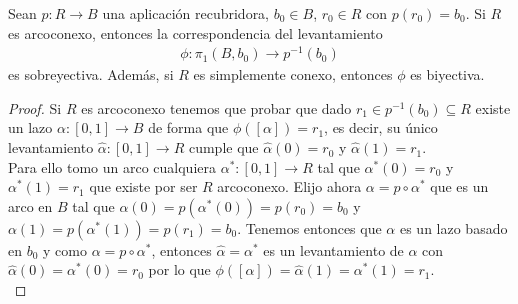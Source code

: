\begin{teo}
    Sean $p:R \to B$ una aplicación recubridora, $b_0\in B$, $r_0\in R$ con $p(r_0)=b_0$. Si $R$ es arcoconexo, entonces la correspondencia del levantamiento 
    \begin{gather*}
        \phi: \pi_1(B,b_0) \to p^{-1}(b_0)
    \end{gather*}
    es sobreyectiva. Además, si $R$ es simplemente conexo, entonces $\phi$ es biyectiva.
    \begin{proof}
        Si $R$ es arcoconexo tenemos que probar que dado $r_1\in p^{-1}(b_0)\subseteq R$ existe un lazo $\alpha:[0,1]\to B$ de forma que $\phi([\alpha]) = r_1$, es decir, su único levantamiento $\hat{\alpha}:[0,1]\to R$ cumple que $\hat{\alpha}(0) = r_0$ y $\hat{\alpha}(1) = r_1$.\\

        Para ello tomo un arco cualquiera $\alpha^*:[0,1]\to R$ tal que $\alpha^*(0) = r_0$ y $\alpha^*(1) = r_1$ que existe por ser $R$ arcoconexo. Elijo ahora $\alpha = p\circ \alpha^*$ que es un arco en $B$ tal que $\alpha(0)= p(\alpha^*(0)) = p(r_0) = b_0$ y $\alpha(1) = p(\alpha^*(1)) = p(r_1) = b_0$. Tenemos entonces que $\alpha$ es un lazo basado en $b_0$ y como $\alpha=p\circ \alpha^*$, entonces $\hat{\alpha} = \alpha^*$ es un levantamiento de $\alpha$ con $\hat{\alpha}(0) = \alpha^*(0) = r_0$ por lo que $\phi([\alpha]) = \hat{\alpha}(1) = \alpha^*(1) = r_1$.\\


\end{proof}
\end{teo}
